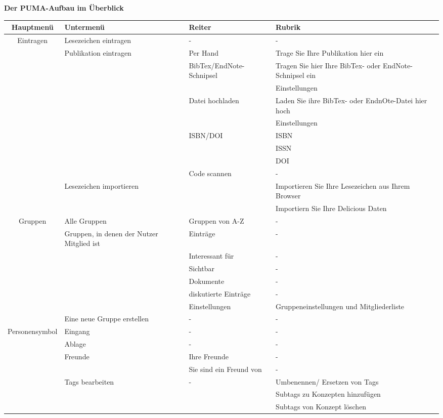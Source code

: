 \documentclass[b5paper,11pt,twoside]{scrbook} %
\begin{document}
\textbf{Der PUMA-Aufbau im Überblick}
\small
\begin{longtable}{|c|m{3cm}|m{3cm}|m{3cm}|}\hline 
\bfseries Hauptmenü&\bfseries Untermenü&Reiter &\bfseries Rubrik\\  \hline
Eintragen&Lesezeichen eintragen &- &-\\ \cline{2-4}
&Publikation eintragen &Per Hand& Trage Sie Ihre Publikation hier ein\\\cline{3-4}
&&BibTex/EndNote-Schnipsel& Tragen Sie hier Ihre BibTex- oder EndNote-Schnipsel ein\\ \cline{4-4}
&&& Einstellungen\\ \cline{3-4}
&&Datei hochladen& Laden Sie ihre BibTex- oder EndnOte-Datei hier hoch\\ \cline{4-4}
&&&Einstellungen\\ \cline{3-4}
&&ISBN/DOI& ISBN\\ \cline{4-4}
&&& ISSN \\ \cline{4-4}
&&&DOI\\ \cline{3-4}
&&Code scannen&-\\ \cline{2-4}
&Lesezeichen importieren& &Importieren Sie Ihre Lesezeichen aus Ihrem Browser\\ \cline{4-4}
&& & Importiern Sie Ihre Delicious Daten\\ \hline 
Gruppen&Alle Gruppen& Gruppen von A-Z &-\\ \cline{2-4}
&Gruppen, in denen der Nutzer Mitglied ist& Einträge &-\\\cline{3-4}
&&Interessant für &- \\ \cline{3-4}
&&Sichtbar&-\\ \cline{3-4}
&&Dokumente&-\\ \cline{3-4}
&&diskutierte Einträge&-\\ \cline{3-4}
&&Einstellungen& Gruppeneinstellungen und Mitgliederliste\\ \cline{2-4}
&Eine neue Gruppe erstellen&-&-\\ \hline
Personensymbol&Eingang&-&-\\ \cline{2-4}
&Ablage&-&-\\ \cline{2-4}
&Freunde&Ihre Freunde&- \\ \cline{3-4}
&&Sie sind ein Freund von&- \\ \cline{2-4}
&Tags bearbeiten&-&Umbenennen/ Ersetzen von Tags\\ \cline{4-4}
&&&Subtags zu Konzepten hinzufügen\\ \cline{4-4}
&&&Subtags von Konzept löschen\\ \cline{2-4}

\end{longtable}
\end{document}

